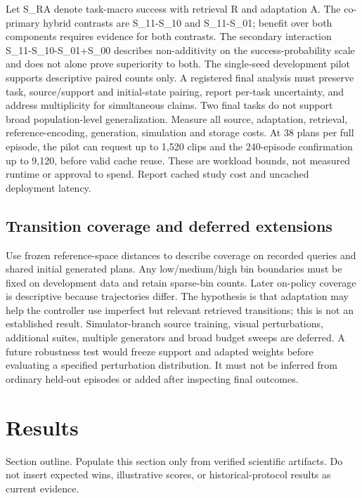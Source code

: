 \documentclass[11pt,a4paper]{article}
\begin{document}
Let S\_RA denote task-macro success with retrieval R and adaptation A. The co-primary hybrid contrasts are S\_11-S\_10 and S\_11-S\_01; benefit over both components requires evidence for both contrasts. The secondary interaction S\_11-S\_10-S\_01+S\_00 describes non-additivity on the success-probability scale and does not alone prove superiority to both. The single-seed development pilot supports descriptive paired counts only. A registered final analysis must preserve task, source/support and initial-state pairing, report per-task uncertainty, and address multiplicity for simultaneous claims. Two final tasks do not support broad population-level generalization. Measure all source, adaptation, retrieval, reference-encoding, generation, simulation and storage costs. At 38 plans per full episode, the pilot can request up to 1,520 clips and the 240-episode confirmation up to 9,120, before valid cache reuse. These are workload bounds, not measured runtime or approval to spend. Report cached study cost and uncached deployment latency.

\subsection{Transition coverage and deferred extensions}

Use frozen reference-space distances to describe coverage on recorded queries and shared initial generated plans. Any low/medium/high bin boundaries must be fixed on development data and retain sparse-bin counts. Later on-policy coverage is descriptive because trajectories differ. The hypothesis is that adaptation may help the controller use imperfect but relevant retrieved transitions; this is not an established result. Simulator-branch source training, visual perturbations, additional suites, multiple generators and broad budget sweeps are deferred. A future robustness test would freeze support and adapted weights before evaluating a specified perturbation distribution. It must not be inferred from ordinary held-out episodes or added after inspecting final outcomes.

\section{Results}

Section outline. Populate this section only from verified scientific artifacts. Do not insert expected wins, illustrative scores, or historical-protocol results as current evidence.
\end{document}
